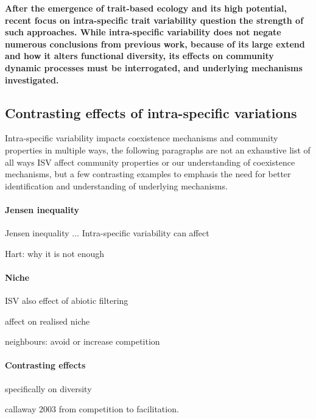 \textbf{After the emergence of trait-based ecology and its high potential, recent focus on intra-specific trait variability question the strength of such approaches. While  intra-specific variability  does not negate numerous conclusions from previous work, because of its large extend and how it alters functional diversity, its effects on community dynamic processes must be interrogated, and underlying mechanisms investigated.}

\subsection{Contrasting effects of intra-specific variations}

Intra-specific variability impacts coexistence mechanisms and community properties in multiple ways, the following paragraphs are not an exhaustive list of all ways ISV affect community properties or our understanding of coexistence mechanisms, but a few contrasting examples to emphasis the need for better identification and understanding of underlying mechanisms. 

\paragraph{Jensen inequality}

Jensen inequality ... 
Intra-specific variability can affect 

Hart: why it is not enough

\paragraph{Niche}

ISV also 
effect of abiotic filtering

affect on realised niche

neighbours: avoid or increase competition


\paragraph{Contrasting effects}

specifically on diversity

callaway 2003 from competition to facilitation.

\cite{bolnick_why_2011}
\parencite{hart_how_2016}
\parencite{courbaud_intra-specific_2010}
\parencite{turcotte_phenotypic_2016}
\parencite{roscher_contrasting_2015}
\parencite{valladares_species_2015}
\parencite{barabas_effect_2016}
\parencite{jung_intraspecific_2010}


